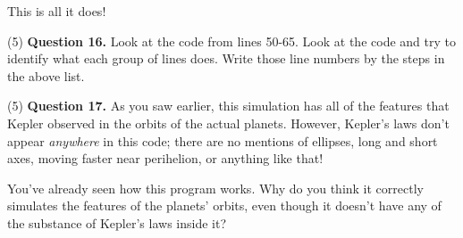 \documentclass[11pt]{article}
\begin{document}
This is all it does! 

\vspace{1em}

(5) \textbf{Question 16.} Look at the code from lines 50-65. Look at the code and try to identify what each group of lines does. Write those line numbers by the steps in the above list. 

(5) \textbf{Question 17.} As you saw earlier, this simulation has all of the features that Kepler observed in the orbits of the actual planets. However, Kepler's laws don't appear {\it anywhere} in this code; there are no mentions of ellipses, long and short axes, moving faster near perihelion, or anything like that!

You've already seen how this program works. Why do you think it correctly simulates the features of the planets' orbits, even though it doesn't have any of the substance of Kepler's laws inside it?
\end{document}
